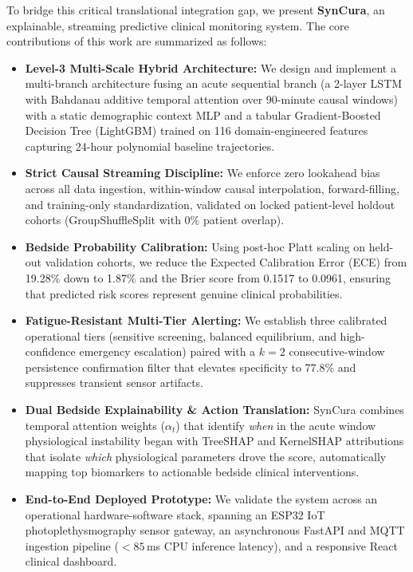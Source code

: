 \documentclass[conference]{IEEEtran}
\begin{document}
To bridge this critical translational integration gap, we present \textbf{SynCura}, an explainable, streaming predictive clinical monitoring system. The core contributions of this work are summarized as follows:
\begin{itemize}
    \item \textbf{Level-3 Multi-Scale Hybrid Architecture:} We design and implement a multi-branch architecture fusing an acute sequential branch (a 2-layer LSTM with Bahdanau additive temporal attention over 90-minute causal windows) with a static demographic context MLP and a tabular Gradient-Boosted Decision Tree (LightGBM) trained on 116 domain-engineered features capturing 24-hour polynomial baseline trajectories.
    \item \textbf{Strict Causal Streaming Discipline:} We enforce zero lookahead bias across all data ingestion, within-window causal interpolation, forward-filling, and training-only standardization, validated on locked patient-level holdout cohorts (GroupShuffleSplit with 0\% patient overlap).
    \item \textbf{Bedside Probability Calibration:} Using post-hoc Platt scaling on held-out validation cohorts, we reduce the Expected Calibration Error (ECE) from 19.28\% down to 1.87\% and the Brier score from 0.1517 to 0.0961, ensuring that predicted risk scores represent genuine clinical probabilities.
    \item \textbf{Fatigue-Resistant Multi-Tier Alerting:} We establish three calibrated operational tiers (sensitive screening, balanced equilibrium, and high-confidence emergency escalation) paired with a $k=2$ consecutive-window persistence confirmation filter that elevates specificity to 77.8\% and suppresses transient sensor artifacts.
    \item \textbf{Dual Bedside Explainability \& Action Translation:} SynCura combines temporal attention weights ($\alpha_t$) that identify \textit{when} in the acute window physiological instability began with TreeSHAP and KernelSHAP attributions that isolate \textit{which} physiological parameters drove the score, automatically mapping top biomarkers to actionable bedside clinical interventions.
    \item \textbf{End-to-End Deployed Prototype:} We validate the system across an operational hardware-software stack, spanning an ESP32 IoT photoplethysmography sensor gateway, an asynchronous FastAPI and MQTT ingestion pipeline ($<85$\,ms CPU inference latency), and a responsive React clinical dashboard.
\end{itemize}
\end{document}

